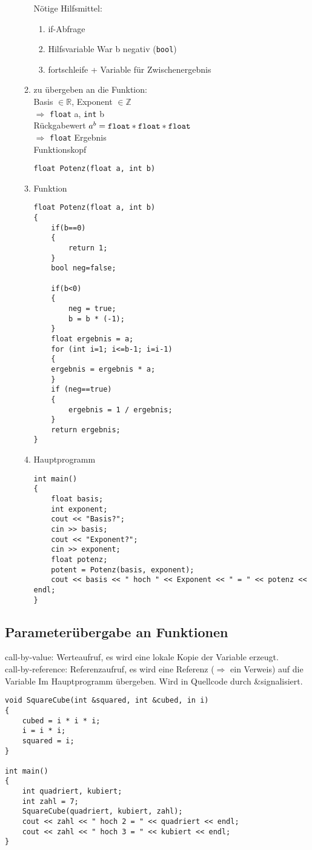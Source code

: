 \begin{enumerate}
\begin{enumerate}
Nötige Hilfsmittel:
\begin{enumerate}
\item if-Abfrage
\item Hilfsvariable War b negativ (\texttt{bool})
\item fortschleife + Variable für Zwischenergebnis
\end{enumerate}
\item zu übergeben an die Funktion: \\
Basis $\in \mathbb{R}$, Exponent $\in \mathbb{Z}$ \\
$\Rightarrow$ \texttt{float} a, \texttt{int} b \\
Rückgabewert $a^b =\mbox{\texttt{float}}*\mbox{\texttt{float}}*\mbox{\texttt{float}}$ \\
$\Rightarrow$ \texttt{float} Ergebnis \\
Funktionskopf
\begin{lstlisting}
float Potenz(float a, int b)
\end{lstlisting}
\item Funktion
\begin{lstlisting}
float Potenz(float a, int b)
{
	if(b==0)
	{
		return 1;
	}
	bool neg=false;
	
	if(b<0)
	{
		neg = true;
		b = b * (-1);
	}
	float ergebnis = a;
	for (int i=1; i<=b-1; i=i-1)
	{
	ergebnis = ergebnis * a;
	}
	if (neg==true)
	{
		ergebnis = 1 / ergebnis;
	}
	return ergebnis;
}
\end{lstlisting}
\item Hauptprogramm
\begin{lstlisting}
int main()
{
	float basis;
	int exponent;
	cout << "Basis?";
	cin >> basis;
	cout << "Exponent?";
	cin >> exponent;
	float potenz;
	potent = Potenz(basis, exponent);
	cout << basis << " hoch " << Exponent << " = " << potenz << endl;
}
\end{lstlisting}
\end{enumerate}
\end{enumerate}

\subsection{Parameterübergabe an Funktionen}
call-by-value: Werteaufruf, es wird eine lokale Kopie der Variable erzeugt. \\
call-by-reference: Referenzaufruf, es wird eine Referenz ($\Rightarrow$ ein Verweis) auf die Variable Im Hauptprogramm übergeben. Wird in Quellcode durch \glqq \&\grqq  signalisiert.
\begin{lstlisting}
void SquareCube(int &squared, int &cubed, in i)
{
	cubed = i * i * i;
	i = i * i;
	squared = i;
}

int main()
{
	int quadriert, kubiert;
	int zahl = 7;
	SquareCube(quadriert, kubiert, zahl);
	cout << zahl << " hoch 2 = " << quadriert << endl;
	cout << zahl << " hoch 3 = " << kubiert << endl;
}
\end{lstlisting}
